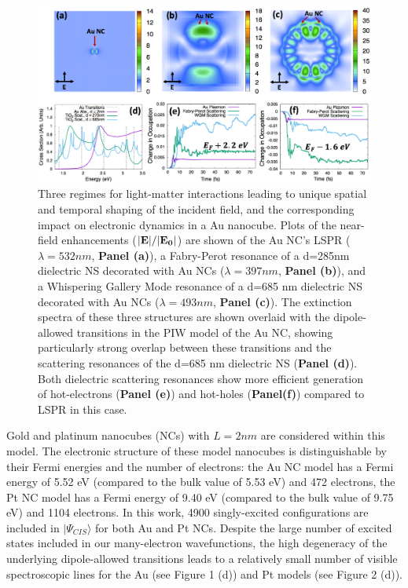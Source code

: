 \documentclass[journal=jpclcd,manuscript=letter]{achemso}
\begin{document}
\begin{figure}
\begin{center}
\includegraphics[width=6in]{figs/Au_AllThree_Alternate.png}
\caption{Three regimes for light-matter interactions leading to unique
spatial and temporal shaping of the incident field, and the corresponding
impact on electronic dynamics in a Au nanocube. Plots of the near-field enhancements (${\bf |E|}/{\bf |E_0|}$) are shown of the
Au NC's LSPR ($\lambda=532 nm$, {\bf Panel (a)}), a Fabry-Perot resonance of a d=285nm dielectric NS decorated with Au NCs ($\lambda = 397 nm$, {\bf Panel (b)}),
and a Whispering Gallery Mode resonance of a d=685 nm dielectric NS decorated with Au NCs ($\lambda = 493 nm$, {\bf Panel (c)}).
The extinction spectra of these three structures are shown overlaid with the dipole-allowed transitions in the PIW model of the Au NC, showing particularly
strong overlap between these transitions and the scattering resonances of the d=685 nm dielectric NS ({\bf Panel (d)}).
Both dielectric scattering resonances show more efficient generation of hot-electrons ({\bf Panel (e)}) and hot-holes ({\bf Panel(f)}) compared to LSPR in this case.}
\end{center}
\end{figure}

Gold and platinum nanocubes (NCs) with $L=2nm$ are considered within this model. The electronic structure
of these model nanocubes is distinguishable by their Fermi energies and the number of electrons: the Au NC model has a Fermi energy
of 5.52 eV (compared to the bulk value of 5.53 eV) and 472 electrons, the Pt NC model has a Fermi energy of 9.40 eV (compared to the bulk
value of 9.75 eV) and 1104 electrons. 
In this work, 4900 singly-excited configurations are included in $|\Psi_{CIS}\rangle$ for both Au and Pt NCs.  
Despite the large number of excited states included in our many-electron wavefunctions, the high 
degeneracy of the underlying dipole-allowed transitions leads to a relatively small number of visible spectroscopic lines for the Au (see Figure 1 (d))
and Pt models (see Figure 2 (d)). 
\end{document}

